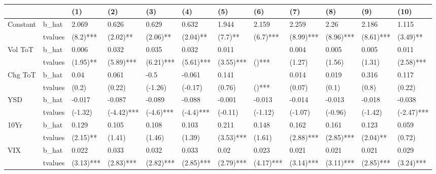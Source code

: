 \begin{tabular}{llllllllllll}
\toprule
   &         &       (1) &       (2) &       (3) &       (4) &       (5) &      (6) &       (7) &       (8) &       (9) &     (10) \\
\midrule
Constant & b\_hat &     2.069 &     0.626 &     0.629 &     0.632 &     1.944 &    2.159 &     2.259 &      2.26 &     2.186 &    1.115 \\
   & tvalues & (8.2)*** & (2.02)** & (2.06)** & (2.04)** & (7.7)** & (6.7)*** & (8.99)*** & (8.96)*** & (8.61)*** & (3.49)**\\ 

Vol ToT & b\_hat &     0.006 &     0.032 &     0.035 &     0.032 &     0.011 &       &     0.004 &     0.005 &     0.005 &    0.011 \\

   & tvalues & (1.95)** & (5.89)*** & (6.21)*** & (5.61)*** & (3.55)*** & ()*** & (1.27) & (1.56) & (1.31) & (2.58)***\\ 


Chg ToT & b\_hat &      0.04 &     0.061 &      -0.5 &    -0.061 &     0.141 &       &     0.014 &     0.019 &     0.316 &    0.117 \\

   & tvalues & (0.2) & (0.22) & (-1.26) & (-0.17) & (0.76) & ()*** & (0.07) & (0.1) & (0.8) & (0.22)\\ 


YSD & b\_hat &    -0.017 &    -0.087 &    -0.089 &    -0.088 &    -0.001 &   -0.013 &    -0.014 &    -0.013 &    -0.018 &   -0.038 \\

   & tvalues & (-1.32) & (-4.42)*** & (-4.6)*** & (-4.4)*** & (-0.11) & (-1.12) & (-1.07) & (-0.96) & (-1.42) & (-2.47)***\\ 


10Yr & b\_hat &     0.129 &     0.105 &     0.108 &     0.103 &     0.211 &    0.148 &     0.162 &     0.161 &     0.123 &    0.059 \\

   & tvalues & (2.15)** & (1.41) & (1.46) & (1.39) & (3.53)*** & (1.61) & (2.88)*** & (2.85)*** & (2.04)** & (0.72)\\ 


VIX & b\_hat &     0.022 &     0.033 &     0.032 &     0.033 &      0.02 &    0.023 &     0.021 &     0.021 &     0.021 &    0.029 \\

   & tvalues & (3.13)*** & (2.83)*** & (2.82)*** & (2.85)*** & (2.79)*** & (4.17)*** & (3.14)*** & (3.11)*** & (2.85)*** & (3.24)***\\ 



\end{tabular}
